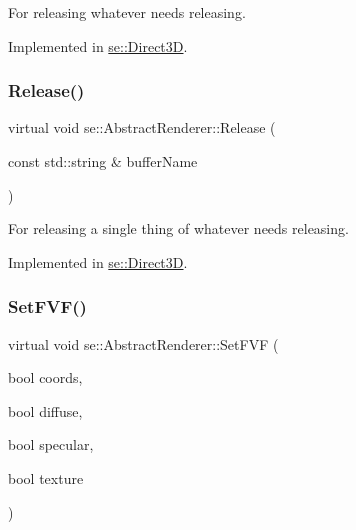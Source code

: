 For releasing whatever needs releasing. 

Implemented in \mbox{\hyperlink{classse_1_1_direct3_d_ae2979f16a5c35773cf2c243d8e6f90e4}{se\+::\+Direct3D}}.

\mbox{\label{classse_1_1_abstract_renderer_af6d6d012f070f95d4c49713002872fcc}} 
\subsubsection{\texorpdfstring{Release()}{Release()}\hspace{0.1cm}{\footnotesize\ttfamily [2/2]}}
{\footnotesize\ttfamily virtual void se\+::\+Abstract\+Renderer\+::\+Release (\begin{DoxyParamCaption}\item[{const std\+::string \&}]{buffer\+Name }\end{DoxyParamCaption})\hspace{0.3cm}{\ttfamily [pure virtual]}}

For releasing a single thing of whatever needs releasing. 

Implemented in \mbox{\hyperlink{classse_1_1_direct3_d_a77f814cda45f2b490e11c522f8e752e3}{se\+::\+Direct3D}}.

\mbox{\label{classse_1_1_abstract_renderer_ad1f734c1726062752a3d43b5eaf77c04}} 
\subsubsection{\texorpdfstring{Set\+F\+V\+F()}{SetFVF()}}
{\footnotesize\ttfamily virtual void se\+::\+Abstract\+Renderer\+::\+Set\+F\+VF (\begin{DoxyParamCaption}\item[{bool}]{coords,  }\item[{bool}]{diffuse,  }\item[{bool}]{specular,  }\item[{bool}]{texture }\end{DoxyParamCaption})\hspace{0.3cm}{\ttfamily [pure virtual]}}

